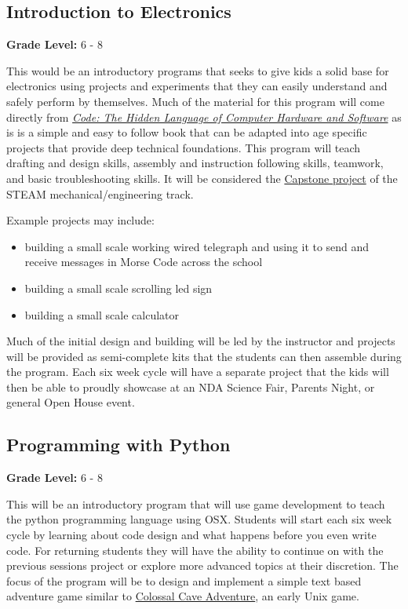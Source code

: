 \documentclass{article}
\begin{document}
\subsection*{Introduction to Electronics}
\textbf{Grade Level:} 6 - 8

This would be an introductory programs that seeks to give kids a solid base for electronics using projects and experiments that they can easily understand and safely perform by themselves. Much of the material for this program will come directly from \textit{\href{http://www.charlespetzold.com/code/}{Code: The Hidden Language of Computer Hardware and Software}} as is is a simple and easy to follow book that can be adapted into age specific projects that provide deep technical foundations. This program will teach drafting and design skills, assembly and instruction following skills, teamwork, and basic troubleshooting skills. It will be considered the \href{http://edglossary.org/capstone-project/}{Capstone project} of the STEAM mechanical/engineering track.

Example projects may include:
\begin{itemize}
  \item building a small scale working wired telegraph and using it to send and receive messages in Morse Code across the school
  \item building a small scale scrolling led sign 
  \item building a small scale calculator
\end{itemize}

Much of the initial design and building will be led by the instructor and projects will be provided as semi-complete kits that the students can then assemble during the program. Each six week cycle will have a separate project that the kids will then be able to proudly showcase at an NDA Science Fair, Parents Night, or general Open House event.

\subsection*{Programming with Python}
\textbf{Grade Level:} 6 - 8

This will be an introductory program that will use game development to teach the python programming language using OSX. Students will start each six week cycle by learning about code design and what happens before you even write code. For returning students they will have the ability to continue on with the previous sessions project or explore more advanced topics at their discretion. The focus of the program will be to design and implement a simple text based adventure game similar to \href{https://en.wikipedia.org/wiki/Colossal_Cave_Adventure}{Colossal Cave Adventure}, an early Unix game.
\end{document}
